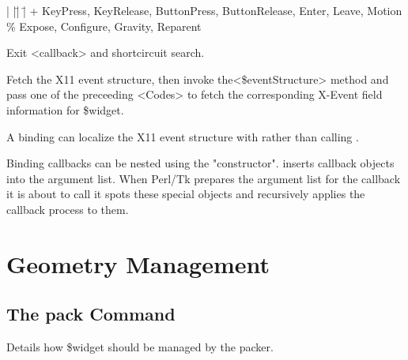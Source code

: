 \begin{tabbing}
|  |\=|    |\= \kill
  \> +  \> KeyPress, KeyRelease, ButtonPress, ButtonRelease, Enter,
Leave, Motion \\
  \> \% \> Expose, Configure, Gravity, Reparent \\
\end{tabbing}
\vspace{-8pt}

\begin{enum}{1cm}

Exit <callback> and shortcircuit  search.

Fetch the X11 event structure, then
invoke the<\$eventStructure> method and pass one of the preceeding
<Codes> to fetch the corresponding X-Event field information for \$widget.

A binding can localize the X11 event structure with 
rather than calling . 

Binding callbacks can be nested using the  "constructor". 
inserts callback objects into the argument list. When Perl/Tk prepares the argument
list for the callback it is about to call it spots these special
objects and recursively applies the callback process to them. 
 
\end{enum}


\section{Geometry Management}

\subsection*{The pack Command}
\vspace{-4pt}
\begin{enum}{1cm}

Details how \$widget should be managed by the packer.

\end{enum}

